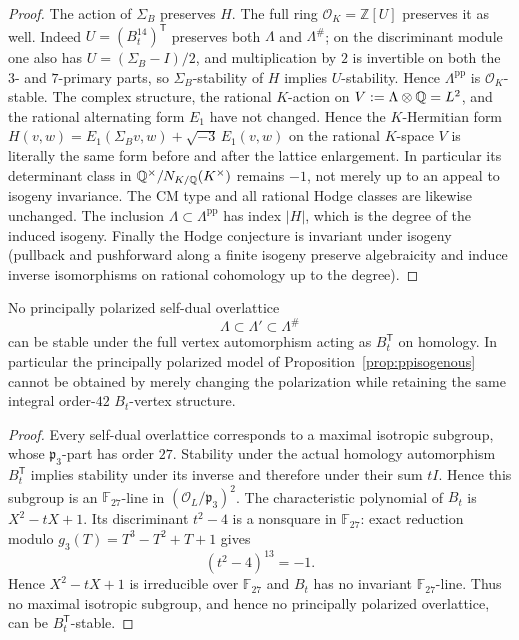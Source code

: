\begin{proof}
The action of $\Sigma_B$ preserves $H$.  The full ring $\mathcal O_K=\mathbb Z[U]$ preserves it as well.  Indeed $U=(B_t^{14})^{\mathsf T}$ preserves both $\Lambda$ and $\Lambda^\#$; on the discriminant module one also has $U=(\Sigma_B-I)/2$, and multiplication by $2$ is invertible on both the $3$- and $7$-primary parts, so $\Sigma_B$-stability of $H$ implies $U$-stability.  Hence $\Lambda^{\mathrm{pp}}$ is $\mathcal O_K$-stable.  The complex structure, the rational $K$-action on $V:=\Lambda\otimes\mathbb Q=L^2$, and the rational alternating form $E_1$ have not changed.  Hence the $K$-Hermitian form $H(v,w)=E_1(\Sigma_Bv,w)+\sqrt{-3}\,E_1(v,w)$ on the rational $K$-space $V$ is literally the same form before and after the lattice enlargement.  In particular its determinant class in $\mathbb Q^\times/N_{K/\mathbb Q}(K^\times)$ remains $-1$, not merely up to an appeal to isogeny invariance.  The CM type and all rational Hodge classes are likewise unchanged.  The inclusion $\Lambda\subset\Lambda^{\mathrm{pp}}$ has index $|H|$, which is the degree of the induced isogeny.  Finally the Hodge conjecture is invariant under isogeny (pullback and pushforward along a finite isogeny preserve algebraicity and induce inverse isomorphisms on rational cohomology up to the degree).
\end{proof}

\begin{corollary}\label{cor:noBstablepp}
No principally polarized self-dual overlattice
\[
 \Lambda\subset\Lambda'\subset\Lambda^\#
\]
can be stable under the full vertex automorphism acting as $B_t^{\mathsf T}$ on homology.  In particular the principally polarized model of Proposition~\ref{prop:ppisogenous} cannot be obtained by merely changing the polarization while retaining the same integral order-$42$ $B_t$-vertex structure.
\end{corollary}
\begin{proof}
Every self-dual overlattice corresponds to a maximal isotropic subgroup,
whose $\mathfrak p_3$-part has order $27$. Stability under the actual
homology automorphism $B_t^{\mathsf T}$ implies stability under its inverse
and therefore under their sum $tI$. Hence this subgroup is an
$\mathbb F_{27}$-line in $(\mathcal O_L/\mathfrak p_3)^2$.  The characteristic polynomial of $B_t$ is $X^2-tX+1$.  Its discriminant $t^2-4$ is a nonsquare in $\mathbb F_{27}$: exact reduction modulo $g_3(T)=T^3-T^2+T+1$ gives
\[
 (t^2-4)^{13}=-1.
\]
Hence $X^2-tX+1$ is irreducible over $\mathbb F_{27}$ and $B_t$ has no invariant $\mathbb F_{27}$-line.  Thus no maximal isotropic subgroup, and hence no principally polarized overlattice, can be $B_t^{\mathsf T}$-stable.
\end{proof}


